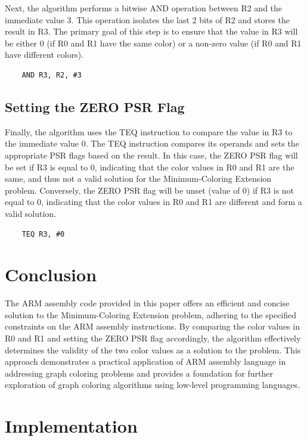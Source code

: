 Next, the algorithm performs a bitwise AND operation between R2 and the immediate value 3. This operation isolates the last 2 bits of R2 and stores the result in R3. The primary goal of this step is to ensure that the value in R3 will be either 0 (if R0 and R1 have the same color) or a non-zero value (if R0 and R1 have different colors).

\begin{verbatim}
    AND R3, R2, #3
\end{verbatim}

\subsection{Setting the ZERO PSR Flag}

Finally, the algorithm uses the TEQ instruction to compare the value in R3 to the immediate value 0. The TEQ instruction compares its operands and sets the appropriate PSR flags based on the result. In this case, the ZERO PSR flag will be set if R3 is equal to 0, indicating that the color values in R0 and R1 are the same, and thus not a valid solution for the Minimum-Coloring Extension problem. Conversely, the ZERO PSR flag will be unset (value of 0) if R3 is not equal to 0, indicating that the color values in R0 and R1 are different and form a valid solution.

\begin{verbatim}
    TEQ R3, #0
\end{verbatim}

\section{Conclusion}

The ARM assembly code provided in this paper offers an efficient and concise solution to the Minimum-Coloring Extension problem, adhering to the specified constraints on the ARM assembly instructions. By comparing the color values in R0 and R1 and setting the ZERO PSR flag accordingly, the algorithm effectively determines the validity of the two color values as a solution to the problem. This approach demonstrates a practical application of ARM assembly language in addressing graph coloring problems and provides a foundation for further exploration of graph coloring algorithms using low-level programming languages.



\section{Implementation}

